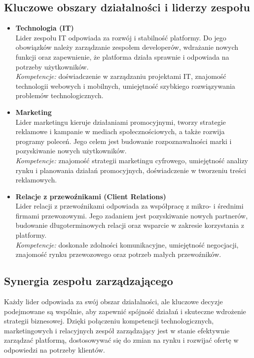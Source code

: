 \subsection{Kluczowe obszary działalności i liderzy zespołu}
\begin{itemize}
    \item \textbf{Technologia (IT)}\\
    Lider zespołu IT odpowiada za rozwój i stabilność platformy. Do jego obowiązków należy zarządzanie zespołem developerów, wdrażanie nowych funkcji oraz zapewnienie, że platforma działa sprawnie i odpowiada na potrzeby użytkowników.\\
    \textit{Kompetencje:} doświadczenie w zarządzaniu projektami IT, znajomość technologii webowych i mobilnych, umiejętność szybkiego rozwiązywania problemów technologicznych.
    
    \item \textbf{Marketing}\\
    Lider marketingu kieruje działaniami promocyjnymi, tworzy strategie reklamowe i kampanie w mediach społecznościowych, a także rozwija programy poleceń. Jego celem jest budowanie rozpoznawalności marki i pozyskiwanie nowych użytkowników.\\
    \textit{Kompetencje:} znajomość strategii marketingu cyfrowego, umiejętność analizy rynku i planowania działań promocyjnych, doświadczenie w tworzeniu treści reklamowych.
    
    \item \textbf{Relacje z przewoźnikami (Client Relations)}\\
    Lider relacji z przewoźnikami odpowiada za współpracę z mikro- i średnimi firmami przewozowymi. Jego zadaniem jest pozyskiwanie nowych partnerów, budowanie długoterminowych relacji oraz wsparcie w zakresie korzystania z platformy.\\
    \textit{Kompetencje:} doskonałe zdolności komunikacyjne, umiejętność negocjacji, znajomość rynku przewozowego oraz potrzeb małych przewoźników.
\end{itemize}

\subsection{Synergia zespołu zarządzającego}
Każdy lider odpowiada za swój obszar działalności, ale kluczowe decyzje podejmowane są wspólnie, aby zapewnić spójność działań i skuteczne wdrożenie strategii biznesowej. Dzięki połączeniu kompetencji technologicznych, marketingowych i relacyjnych zespół zarządzający jest w stanie efektywnie zarządzać platformą, dostosowywać się do zmian na rynku i rozwijać ofertę w odpowiedzi na potrzeby klientów.